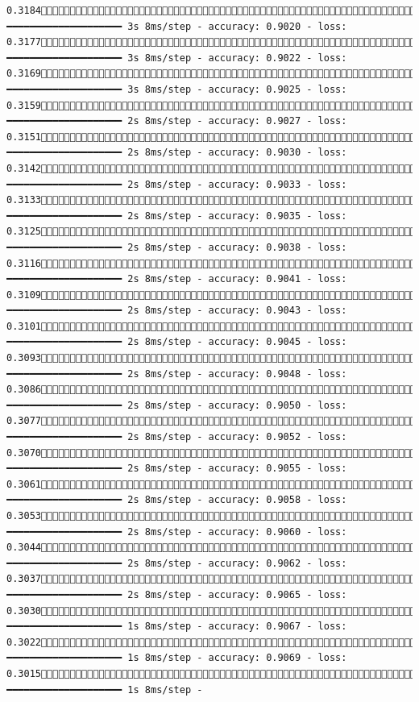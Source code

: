 \documentclass[
  letterpaper,
  DIV=11,
  numbers=noendperiod]{scrreprt}
\begin{document}
\begin{verbatim}
0.31841480/1875 ━━━━━━━━━━━━━━━━━━━━ 3s 8ms/step - accuracy: 0.9020 - loss: 0.31771487/1875 ━━━━━━━━━━━━━━━━━━━━ 3s 8ms/step - accuracy: 0.9022 - loss: 0.31691495/1875 ━━━━━━━━━━━━━━━━━━━━ 3s 8ms/step - accuracy: 0.9025 - loss: 0.31591502/1875 ━━━━━━━━━━━━━━━━━━━━ 2s 8ms/step - accuracy: 0.9027 - loss: 0.31511510/1875 ━━━━━━━━━━━━━━━━━━━━ 2s 8ms/step - accuracy: 0.9030 - loss: 0.31421518/1875 ━━━━━━━━━━━━━━━━━━━━ 2s 8ms/step - accuracy: 0.9033 - loss: 0.31331525/1875 ━━━━━━━━━━━━━━━━━━━━ 2s 8ms/step - accuracy: 0.9035 - loss: 0.31251533/1875 ━━━━━━━━━━━━━━━━━━━━ 2s 8ms/step - accuracy: 0.9038 - loss: 0.31161540/1875 ━━━━━━━━━━━━━━━━━━━━ 2s 8ms/step - accuracy: 0.9041 - loss: 0.31091547/1875 ━━━━━━━━━━━━━━━━━━━━ 2s 8ms/step - accuracy: 0.9043 - loss: 0.31011554/1875 ━━━━━━━━━━━━━━━━━━━━ 2s 8ms/step - accuracy: 0.9045 - loss: 0.30931561/1875 ━━━━━━━━━━━━━━━━━━━━ 2s 8ms/step - accuracy: 0.9048 - loss: 0.30861569/1875 ━━━━━━━━━━━━━━━━━━━━ 2s 8ms/step - accuracy: 0.9050 - loss: 0.30771576/1875 ━━━━━━━━━━━━━━━━━━━━ 2s 8ms/step - accuracy: 0.9052 - loss: 0.30701584/1875 ━━━━━━━━━━━━━━━━━━━━ 2s 8ms/step - accuracy: 0.9055 - loss: 0.30611592/1875 ━━━━━━━━━━━━━━━━━━━━ 2s 8ms/step - accuracy: 0.9058 - loss: 0.30531600/1875 ━━━━━━━━━━━━━━━━━━━━ 2s 8ms/step - accuracy: 0.9060 - loss: 0.30441607/1875 ━━━━━━━━━━━━━━━━━━━━ 2s 8ms/step - accuracy: 0.9062 - loss: 0.30371614/1875 ━━━━━━━━━━━━━━━━━━━━ 2s 8ms/step - accuracy: 0.9065 - loss: 0.30301621/1875 ━━━━━━━━━━━━━━━━━━━━ 1s 8ms/step - accuracy: 0.9067 - loss: 0.30221628/1875 ━━━━━━━━━━━━━━━━━━━━ 1s 8ms/step - accuracy: 0.9069 - loss: 0.30151635/1875 ━━━━━━━━━━━━━━━━━━━━ 1s 8ms/step - 
\end{verbatim}
\end{document}
